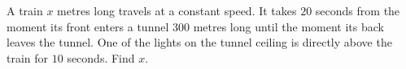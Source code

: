 A train $x$ metres long travels at a constant speed. It takes $20$ seconds from the moment its front enters a tunnel $300$ metres long until the moment its back leaves the tunnel. One of the lights on the tunnel ceiling is directly above the train for $10$ seconds. Find $x$.

